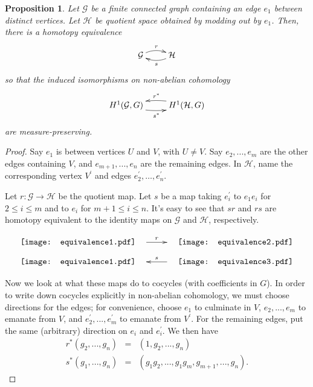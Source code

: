 \documentclass[12pt]{article}
\newtheorem{prop}[thm]{Proposition}
\newcommand{\p}{\prime}
\newcommand{\HH}{\mathcal{H}}
\newcommand{\GG}{\mathcal{G}}
\newcommand{\surj}{\twoheadrightarrow}
\newcommand{\be}{\begin{equation}}
\newcommand{\ee}{\end{equation}}
\newcommand{\bea}{\begin{eqnarray}}
\newcommand{\eea}{\end{eqnarray}}
\newcommand{\nn}{\nonumber}
\begin{document}
\begin{prop}\label{oneedge}
Let $\GG$ be a finite connected graph containing an edge $e_1$ between distinct vertices.  Let $\HH$ be quotient space obtained by modding out by $e_1$.
Then, there is a homotopy equivalence
\be 
\xymatrix{
\GG \ar@/^.5pc/[r]^r & \ar@/^.5pc/[l]^s \HH
}
\ee
so that the induced isomorphisms on non-abelian cohomology
\be 
\xymatrix{
H^1(\GG,G) \ar@/_.5pc/[r]_{s^*} & \ar@/_.5pc/[l]_{r^*} H^1(\HH,G)
}
\ee
are measure-preserving.
\end{prop}
\begin{proof}
Say $e_1$ is between vertices $U$ and $V$, with $U \neq V$.  Say $e_2,...,e_m$ are the other edges containing $V$, and $e_{m+1},...,e_n$ are the remaining edges.  In $\HH$, name the corresponding vertex $V^\p$ and edges $e_2^\p, \ldots, e_n^\p$.

Let $r : \GG \to \HH$ be the quotient map.  Let $s$ be a map taking $e_i^\p$ to $e_1e_i$ for $2 \leq i \leq m$ and to $e_i$ for $m+1 \leq i \leq n$.  It's easy to see that $sr$ and $rs$ are homotopy equivalent to the identity maps on $\GG$ and $\HH$, respectively.

\be 
\xymatrix{
\texttt{[image: equivalence1.pdf]} \ \ \ \ar[r]^r & \ \ \ \texttt{[image: equivalence2.pdf]}
}
\ee
\be
\xymatrix{
\texttt{[image: equivalence1.pdf]} \ \ \ & \ \ \ \texttt{[image: equivalence3.pdf]} \ar[l]_s
}
\ee

Now we look at what these maps do to cocycles (with coefficients in $G$).  In order to write down cocycles explicitly in non-abelian cohomology, we must choose directions for the edges; for convenience, choose $e_1$ to culminate in $V$, $e_2,...,e_m$ to emanate from $V$, and $e_2^\p,...,e_m^\p$ to emanate from $V^\p$.  For the remaining edges, put the same (arbitrary) direction on $e_i$ and $e_i^\p$.  We then have
\bea
r^*(g_2,...,g_n) &=& (1,g_2,...,g_n)\nn\\
s^*(g_1,...,g_n) &=& (g_1g_2,...,g_1g_m,g_{m+1},...,g_n).
\eea


\end{proof}
\end{document}
